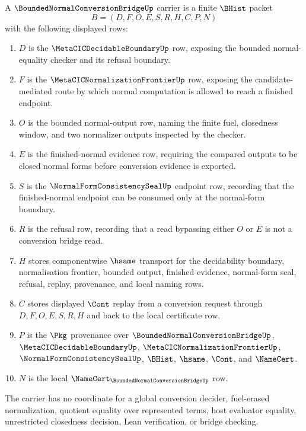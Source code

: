 \begin{definition}
\label{def:bounded-normal-conversion-bridge-carrier}
A $\BoundedNormalConversionBridgeUp$ carrier is a finite $\BHist$ packet
$$
B=(D,F,O,E,S,R,H,C,P,N)
$$
with the following displayed rows:
\begin{enumerate}
\item $D$ is the $\MetaCICDecidableBoundaryUp$ row, exposing the bounded normal-equality checker and its refusal boundary.
\item $F$ is the $\MetaCICNormalizationFrontierUp$ row, exposing the candidate-mediated route by which normal computation is allowed to reach a finished endpoint.
\item $O$ is the bounded normal-output row, naming the finite fuel, closedness window, and two normalizer outputs inspected by the checker.
\item $E$ is the finished-normal evidence row, requiring the compared outputs to be closed normal forms before conversion evidence is exported.
\item $S$ is the $\NormalFormConsistencySealUp$ endpoint row, recording that the finished-normal endpoint can be consumed only at the normal-form boundary.
\item $R$ is the refusal row, recording that a read bypassing either $O$ or $E$ is not a conversion bridge read.
\item $H$ stores componentwise $\hsame$ transport for the decidability boundary, normalisation frontier, bounded output, finished evidence, normal-form seal, refusal, replay, provenance, and local naming rows.
\item $C$ stores displayed $\Cont$ replay from a conversion request through $D,F,O,E,S,R,H$ and back to the local certificate row.
\item $P$ is the $\Pkg$ provenance over $\BoundedNormalConversionBridgeUp$, $\MetaCICDecidableBoundaryUp$, $\MetaCICNormalizationFrontierUp$, $\NormalFormConsistencySealUp$, $\BHist$, $\hsame$, $\Cont$, and $\NameCert$.
\item $N$ is the local $\NameCert_{\BoundedNormalConversionBridgeUp}$ row.
\end{enumerate}
The carrier has no coordinate for a global conversion decider, fuel-erased normalization, quotient equality over represented terms, host evaluator equality, unrestricted closedness decision, Lean verification, or bridge checking.
\end{definition}

